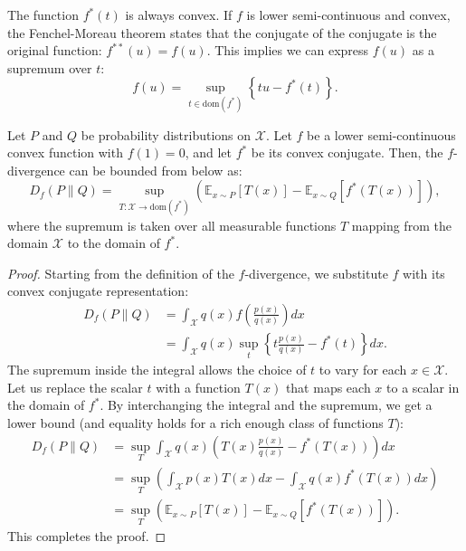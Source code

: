 The function $f^*(t)$ is always convex. If $f$ is lower semi-continuous and convex, the Fenchel-Moreau theorem states that the conjugate of the conjugate is the original function: $f^{**}(u) = f(u)$. This implies we can express $f(u)$ as a supremum over $t$:
\begin{equation}
    f(u) = \sup_{t \in \text{dom}(f^*)} \left\{ tu - f^*(t) \right\}.
\end{equation}

\begin{theorem}
\label{thm:variational_bound}
Let $P$ and $Q$ be probability distributions on $\mathcal{X}$. Let $f$ be a lower semi-continuous convex function with $f(1)=0$, and let $f^*$ be its convex conjugate. Then, the $f$-divergence can be bounded from below as:
\begin{equation}
    D_f(P \parallel Q) = \sup_{T: \mathcal{X} \to \text{dom}(f^*)} \left( \mathbb{E}_{x \sim P}[T(x)] - \mathbb{E}_{x \sim Q}[f^*(T(x))] \right),
\end{equation}
where the supremum is taken over all measurable functions $T$ mapping from the domain $\mathcal{X}$ to the domain of $f^*$.
\end{theorem}
\begin{proof}
Starting from the definition of the $f$-divergence, we substitute $f$ with its convex conjugate representation:
\begin{align*}
    D_f(P \parallel Q) &= \int_{\mathcal{X}} q(x) f\left( \frac{p(x)}{q(x)} \right) dx \\
                       &= \int_{\mathcal{X}} q(x) \sup_{t} \left\{ t \frac{p(x)}{q(x)} - f^*(t) \right\} dx.
\end{align*}
The supremum inside the integral allows the choice of $t$ to vary for each $x \in \mathcal{X}$. Let us replace the scalar $t$ with a function $T(x)$ that maps each $x$ to a scalar in the domain of $f^*$. By interchanging the integral and the supremum, we get a lower bound (and equality holds for a rich enough class of functions $T$):
\begin{align*}
    D_f(P \parallel Q) &= \sup_{T} \int_{\mathcal{X}} q(x) \left( T(x) \frac{p(x)}{q(x)} - f^*(T(x)) \right) dx \\
                       &= \sup_{T} \left( \int_{\mathcal{X}} p(x) T(x) dx - \int_{\mathcal{X}} q(x) f^*(T(x)) dx \right) \\
                       &= \sup_{T} \left( \mathbb{E}_{x \sim P}[T(x)] - \mathbb{E}_{x \sim Q}[f^*(T(x))] \right).
\end{align*}
This completes the proof.
\end{proof}

